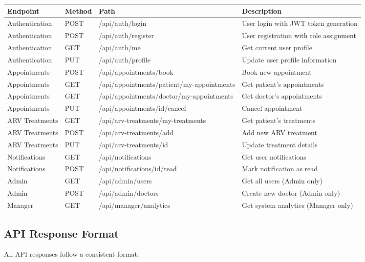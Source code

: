 \documentclass[12pt,a4paper]{article}
\begin{document}
\begin{longtable}{|p{3cm}|p{2cm}|p{3cm}|p{8cm}|}
\hline
\textbf{Endpoint} & \textbf{Method} & \textbf{Path} & \textbf{Description} \\
\hline
Authentication & POST & /api/auth/login & User login with JWT token generation \\
\hline
Authentication & POST & /api/auth/register & User registration with role assignment \\
\hline
Authentication & GET & /api/auth/me & Get current user profile \\
\hline
Authentication & PUT & /api/auth/profile & Update user profile information \\
\hline
Appointments & POST & /api/appointments/book & Book new appointment \\
\hline
Appointments & GET & /api/appointments/patient/my-appointments & Get patient's appointments \\
\hline
Appointments & GET & /api/appointments/doctor/my-appointments & Get doctor's appointments \\
\hline
Appointments & PUT & /api/appointments/{id}/cancel & Cancel appointment \\
\hline
ARV Treatments & GET & /api/arv-treatments/my-treatments & Get patient's treatments \\
\hline
ARV Treatments & POST & /api/arv-treatments/add & Add new ARV treatment \\
\hline
ARV Treatments & PUT & /api/arv-treatments/{id} & Update treatment details \\
\hline
Notifications & GET & /api/notifications & Get user notifications \\
\hline
Notifications & POST & /api/notifications/{id}/read & Mark notification as read \\
\hline
Admin & GET & /api/admin/users & Get all users (Admin only) \\
\hline
Admin & POST & /api/admin/doctors & Create new doctor (Admin only) \\
\hline
Manager & GET & /api/manager/analytics & Get system analytics (Manager only) \\
\hline
\end{longtable}

\subsection{API Response Format}

All API responses follow a consistent format:
\end{document}
